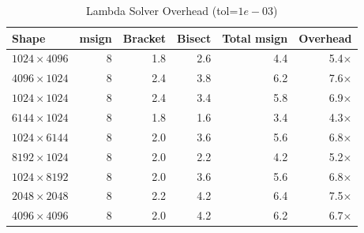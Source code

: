 \begin{table}[t]
\centering
\caption{Lambda Solver Overhead (tol=$1e-03$)}
\label{tab:lambda_solver_overhead}
\begin{tabular}{lrrrrr}
\toprule
Shape & msign & Bracket & Bisect & Total msign & Overhead \\
\midrule
$1024\times4096$ & 8 & 1.8 & 2.6 & 4.4 & 5.4$\times$ \\
$4096\times1024$ & 8 & 2.4 & 3.8 & 6.2 & 7.6$\times$ \\
$1024\times1024$ & 8 & 2.4 & 3.4 & 5.8 & 6.9$\times$ \\
$6144\times1024$ & 8 & 1.8 & 1.6 & 3.4 & 4.3$\times$ \\
$1024\times6144$ & 8 & 2.0 & 3.6 & 5.6 & 6.8$\times$ \\
$8192\times1024$ & 8 & 2.0 & 2.2 & 4.2 & 5.2$\times$ \\
$1024\times8192$ & 8 & 2.0 & 3.6 & 5.6 & 6.8$\times$ \\
$2048\times2048$ & 8 & 2.2 & 4.2 & 6.4 & 7.5$\times$ \\
$4096\times4096$ & 8 & 2.0 & 4.2 & 6.2 & 6.7$\times$ \\
\bottomrule
\end{tabular}
\end{table}